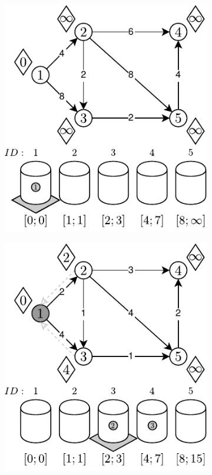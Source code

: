 \begin{figure}[!htbp]
	\centering
	\begin{subfigure}[b]{0.3\textwidth}
		\includegraphics[width=\textwidth]{Chapter_II/7/a.pdf}
		\caption{}
	\end{subfigure}
	\begin{subfigure}[b]{0.3\textwidth}
		\includegraphics[width=\textwidth]{Chapter_II/7/b.pdf}

\end{subfigure}
\end{figure}
